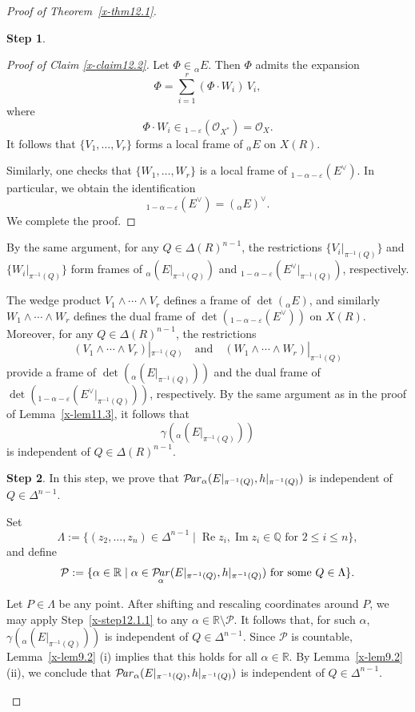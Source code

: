 \documentclass[12pt,twoside]{amsart}
\DeclareMathOperator{\re}{Re}
\DeclareMathOperator{\im}{Im}
\DeclareMathOperator{\Par}{\mathcal{P}\!\it{ar}}
\theoremstyle{definition}
\newtheorem{step}{Step}
\begin{document}
\begin{proof}[Proof of Theorem~\ref{x-thm12.1}]
\begin{step}
\begin{proof}[Proof of Claim \ref{x-claim12.2}]
Let $\Phi \in {}_\alpha E$.
Then $\Phi$ admits the expansion
\[
\Phi = \sum_{i=1}^r (\Phi \cdot W_i)\, V_i,
\]
where
\[
\Phi \cdot W_i \in {}_{1-\varepsilon}\left(\mathcal O_{X^*}\right)
= \mathcal O_X.
\]
It follows that $\{V_1,\ldots,V_r\}$ forms a local frame of
${}_\alpha E$ on $X(R)$.

Similarly, one checks that $\{W_1,\ldots,W_r\}$ is a local frame of
${}_{1-\alpha-\varepsilon}(E^\vee)$.
In particular, we obtain the identification
\[
{}_{1-\alpha-\varepsilon}(E^\vee) = ({}_\alpha E)^\vee.
\] 
We complete the proof. 
\end{proof}

By the same argument, for any $Q\in \Delta(R)^{n-1}$,
the restrictions $\{V_i|_{\pi^{-1}(Q)}\}$ and $\{W_i|_{\pi^{-1}(Q)}\}$ form
frames of ${}_\alpha(E|_{\pi^{-1}(Q)})$ and
${}_{1-\alpha-\varepsilon}(E^\vee|_{\pi^{-1}(Q)})$, respectively. 

The wedge product $V_1\wedge \cdots \wedge V_r$ defines a frame of
$\det({}_\alpha E)$, and similarly
$W_1\wedge \cdots \wedge W_r$ defines the dual frame of
$\det({}_{1-\alpha-\varepsilon}(E^\vee))$ on $X(R)$.
Moreover, for any $Q\in \Delta(R)^{n-1}$,
the restrictions
\[
(V_1\wedge \cdots \wedge V_r)|_{\pi^{-1}(Q)}
\quad \text{and} \quad
(W_1\wedge \cdots \wedge W_r)|_{\pi^{-1}(Q)}
\]
provide a frame of
$\det({}_\alpha(E|_{\pi^{-1}(Q)}))$ and the dual frame of
$\det({}_{1-\alpha-\varepsilon}(E^\vee|_{\pi^{-1}(Q)}))$,
respectively.
By the same argument as in the proof of Lemma~\ref{x-lem11.3}, it follows that
\[
\gamma\!\left({}_\alpha(E|_{\pi^{-1}(Q)})\right)
\]
is independent of $Q\in \Delta(R)^{n-1}$. 
\end{step}

\begin{step}\label{x-step12.1.2}
In this step, we prove that
$\Par_\alpha(E|_{\pi^{-1}(Q)},h|_{\pi^{-1}(Q)})$ is independent of
$Q\in \Delta^{n-1}$.

Set
\[
\Lambda:=\{(z_2,\ldots,z_n)\in \Delta^{n-1}\mid
\re z_i,\im z_i\in\mathbb Q \text{ for } 2\le i\le n\},
\]
and define
\[
\mathcal P:=\{\alpha\in\mathbb R\mid
\alpha\in \Par_\alpha(E|_{\pi^{-1}(Q)},h|_{\pi^{-1}(Q)})
\text{ for some } Q\in\Lambda\}.
\]

Let $P\in \Lambda$ be any point.
After shifting and rescaling coordinates around $P$, we may apply
Step~\ref{x-step12.1.1} to any $\alpha\in\mathbb R\setminus\mathcal P$.
It follows that, for such $\alpha$,
$\gamma({}_\alpha(E|_{\pi^{-1}(Q)}))$ is independent of
$Q\in \Delta^{n-1}$.
Since $\mathcal P$ is countable, Lemma~\ref{x-lem9.2} (i) 
implies that this
holds for all $\alpha\in\mathbb R$.
By Lemma~\ref{x-lem9.2} (ii), we conclude that
$\Par_\alpha(E|_{\pi^{-1}(Q)},h|_{\pi^{-1}(Q)})$ is independent of
$Q\in \Delta^{n-1}$.
\end{step}


\end{proof}
\end{document}
